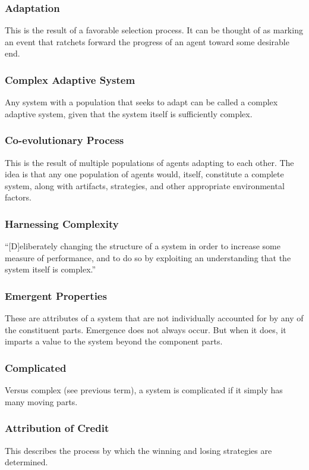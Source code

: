 \documentclass[jou,apacite]{apa6}
\begin{document}
\subsubsection{Adaptation}
This is the result of a favorable selection process.  It can be thought of as marking an event that ratchets forward the progress of an agent toward some desirable end.

\subsubsection{Complex Adaptive System}
Any system with a population that seeks to adapt can be called a complex adaptive system, given that the system itself is sufficiently complex.

\subsubsection{Co-evolutionary Process}
This is the result of multiple populations of agents adapting to each other.  The idea is that any one population of agents would, itself, constitute a complete system, along with artifacts, strategies, and other appropriate environmental factors.

\subsubsection{Harnessing Complexity}
``[D]eliberately changing the structure of a system in order to increase some measure of performance, and to do so by exploiting an understanding that the system itself is complex.''~\cite[page 9]{Axelrod}

\subsubsection{Emergent Properties}
These are attributes of a system that are not individually accounted for by any of the constituent parts.  Emergence does not always occur.  But when it does, it imparts a value to the system beyond the component parts.

\subsubsection{Complicated}
Versus complex (see previous term), a system is complicated if it simply has many moving parts.

\subsubsection{Attribution of Credit}
This describes the process by which the winning and losing strategies are determined.
\end{document}
